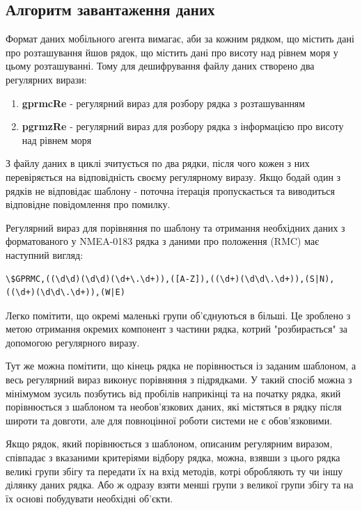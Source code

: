 \documentclass[simple,a4paper,14pt,ukrainian,utf8]{eskdtext}
\begin{document}
	\subsection{Алгоритм завантаження даних}
	
	Формат даних мобільного агента вимагає, аби за кожним рядком, що містить дані про розташування йшов рядок, що містить дані про висоту над рівнем моря у цьому розташуванні. Тому для дешифрування файлу даних створено два регулярних вирази:
	
	\begin{enumerate}
		\item \textbf{gprmcRe} - регулярний вираз для розбору рядка з розташуванням
		\item \textbf{pgrmzRe} - регулярний вираз для розбору рядка з інформацією про висоту над рівнем моря
	\end{enumerate}
	
	З файлу даних в циклі зчитується по два рядки, після чого кожен з них перевіряється на відповідність своєму регулярному виразу. Якщо бодай один з рядків не відповідає шаблону - поточна ітерація пропускається та виводиться відповідне повідомлення про помилку.
	
	Регулярний вираз для порівняння по шаблону та отримання необхідних даних з форматованого у NMEA-0183 рядка  з даними про положення (RMC) має наступний вигляд:
	
\begin{small}
\begin{lstlisting}
\$GPRMC,((\d\d)(\d\d)(\d+\.\d+)),([A-Z]),((\d+)(\d\d\.\d+)),(S|N),((\d+)(\d\d\.\d+)),(W|E)
\end{lstlisting}
\end{small}

	Легко помітити, що окремі маленькі групи об’єднуються в більші. Це зроблено з метою отримання окремих компонент з частини рядка, котрий "розбирається" за допомогою регулярного виразу.
	
	Тут же можна помітити, що кінець рядка не порівнюється із заданим шаблоном, а весь регулярний вираз виконує порівняння з підрядками. У такий спосіб можна з мінімумом зусиль позбутись від пробілів наприкінці та на початку рядка, який порівнюється з шаблоном та необов’язкових даних, які містяться в рядку після широти та довготи, але для повноцінної роботи системи не є обов’язковими.
	
	Якщо рядок, який порівнюється з шаблоном, описаним регулярним виразом, співпадає з вказаними критеріями відбору рядка, можна, взявши з цього рядка великі групи збігу та передати їх на вхід методів, котрі обробляють ту чи іншу ділянку даних рядка. Або ж одразу взяти менші групи з великої групи збігу та на їх основі побудувати необхідні об’єкти.
	
\end{document}
